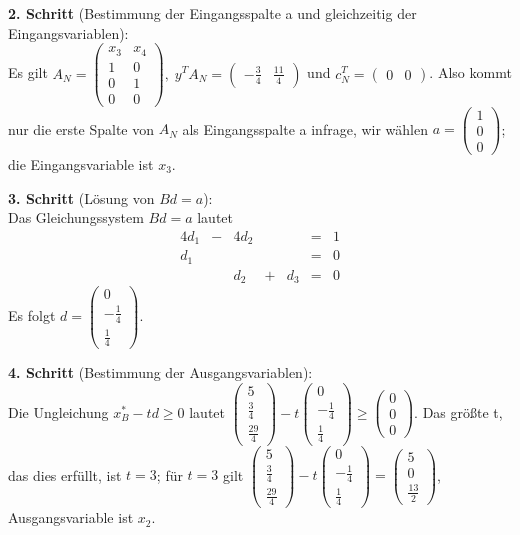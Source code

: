 \documentclass[10pt,a4paper,oneside,ngerman,numbers=noenddot]{scrartcl}
\begin{document}
		\textbf{2. Schritt} (Bestimmung der Eingangsspalte a und gleichzeitig der Eingangsvariablen):\\
		Es gilt $A_{N} = \begin{pmatrix} x_{3} & x_{4} \\ 1 & 0 \\ 0 & 1 \\ 0 & 0 \end{pmatrix},\; y^{T}A_{N} = \begin{pmatrix} -\frac{3}{4} & \frac{11}{4} \end{pmatrix}$ und $c_{N}^{T} = \begin{pmatrix} 0 & 0 \end{pmatrix}$. Also kommt nur die erste Spalte von $A_{N}$ als Eingangsspalte a infrage, wir wählen $a = \begin{pmatrix} 1 \\ 0 \\ 0 \end{pmatrix}$; die Eingangsvariable ist $x_{3}$.
		
		\textbf{3. Schritt} (Lösung von $Bd = a$):\\
		Das Gleichungssystem $Bd = a$ lautet
		\begin{alignat*}{4}
			d_{1} &-& 4d_{2} && &=& 1\\
			d_{1} && && &=& 0 \\
			&& d_{2} &+& d_{3} &=& 0
		\end{alignat*}
		Es folgt $d = \begin{pmatrix} 0 \\ -\frac{1}{4} \\ \frac{1}{4} \end{pmatrix}$.
		
		\textbf{4. Schritt} (Bestimmung der Ausgangsvariablen):\\
		Die Ungleichung $x_{B}^{*} - td \geq 0$ lautet $\begin{pmatrix} 5 \\ \frac{3}{4} \\ \frac{29}{4}\end{pmatrix} - t \begin{pmatrix}0 \\ -\frac{1}{4} \\ \frac{1}{4} \end{pmatrix} \geq \begin{pmatrix} 0 \\ 0 \\ 0 \end{pmatrix}$. Das größte t, das dies erfüllt, ist $t = 3$; für $t = 3$ gilt $\begin{pmatrix} 5 \\ \frac{3}{4} \\ \frac{29}{4}\end{pmatrix} - t \begin{pmatrix} 0 \\ -\frac{1}{4} \\ \frac{1}{4} \end{pmatrix} = \begin{pmatrix} 5 \\ 0 \\ \frac{13}{2} \end{pmatrix}$, Ausgangsvariable ist $x_{2}$.
		
\end{document}
